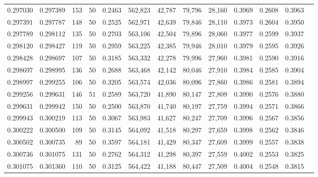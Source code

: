 \begin{tabular}{rrrrrrrrrrrrr}
0.297030 & 0.297389 &   153 &  50 &                                     0.2463 & 562,823 &  42,787 &  79,796 &  28,160 & 0.3969 & 0.2608 & 0.3963 \\
0.297391 & 0.297787 &   148 &  50 &                                     0.2525 & 562,971 &  42,639 &  79,846 &  28,110 & 0.3973 & 0.2604 & 0.3950 \\
0.297789 & 0.298112 &   135 &  50 &                                     0.2703 & 563,106 &  42,504 &  79,896 &  28,060 & 0.3977 & 0.2599 & 0.3937 \\
0.298120 & 0.298427 &   119 &  50 &                                     0.2959 & 563,225 &  42,385 &  79,946 &  28,010 & 0.3979 & 0.2595 & 0.3926 \\
0.298428 & 0.298697 &   107 &  50 &                                     0.3185 & 563,332 &  42,278 &  79,996 &  27,960 & 0.3981 & 0.2590 & 0.3916 \\
0.298697 & 0.298995 &   136 &  50 &                                     0.2688 & 563,468 &  42,142 &  80,046 &  27,910 & 0.3984 & 0.2585 & 0.3904 \\
0.298997 & 0.299255 &   106 &  50 &                                     0.3205 & 563,574 &  42,036 &  80,096 &  27,860 & 0.3986 & 0.2581 & 0.3894 \\
0.299256 & 0.299631 &   146 &  51 &                                     0.2589 & 563,720 &  41,890 &  80,147 &  27,809 & 0.3990 & 0.2576 & 0.3880 \\
0.299631 & 0.299942 &   150 &  50 &                                     0.2500 & 563,870 &  41,740 &  80,197 &  27,759 & 0.3994 & 0.2571 & 0.3866 \\
0.299943 & 0.300219 &   113 &  50 &                                     0.3067 & 563,983 &  41,627 &  80,247 &  27,709 & 0.3996 & 0.2567 & 0.3856 \\
0.300222 & 0.300500 &   109 &  50 &                                     0.3145 & 564,092 &  41,518 &  80,297 &  27,659 & 0.3998 & 0.2562 & 0.3846 \\
0.300502 & 0.300735 &    89 &  50 &                                     0.3597 & 564,181 &  41,429 &  80,347 &  27,609 & 0.3999 & 0.2557 & 0.3838 \\
0.300736 & 0.301075 &   131 &  50 &                                     0.2762 & 564,312 &  41,298 &  80,397 &  27,559 & 0.4002 & 0.2553 & 0.3825 \\
0.301075 & 0.301360 &   110 &  50 &                                     0.3125 & 564,422 &  41,188 &  80,447 &  27,509 & 0.4004 & 0.2548 & 0.3815 \\

\end{tabular}
